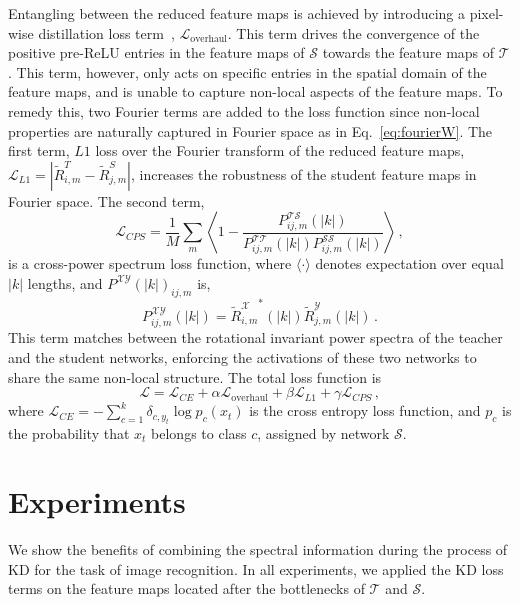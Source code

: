 \documentclass{article}
\begin{document}
Entangling between the reduced feature maps is achieved by introducing a pixel-wise distillation loss term~\cite{heo2019comprehensive}, $\mathcal{L}_{\text{overhaul}}$. This term drives the convergence of the positive pre-ReLU entries in the feature maps of $\mathcal{S}$ towards the feature maps of $\mathcal{T}$. This term, however, only acts on specific entries in the spatial domain of the feature maps, and is unable to capture non-local aspects of the feature maps. To remedy this, two Fourier terms are added to the loss function since non-local properties are naturally captured in Fourier space as in Eq.~\eqref{eq:fourierW}. The first term, $L1$ loss over the Fourier transform of the reduced feature maps, $\mathcal{L}_{L1} = \left\vert \tilde R^T_{i,m}\! -\! \tilde R^S_{j,m} \right\vert $, increases the robustness of the student feature maps in Fourier space. The second term,
\begin{equation}
    \mathcal{L}_{CPS} = \frac{1}{M}\sum_m\left\langle 1-\frac{P^{\mathcal{T}\mathcal{S}}_{ij,m}\left(\vert k \vert\right)}{P^{\mathcal{T}\mathcal{T}}_{ij,m}\left(\vert k \vert\right)P^{\mathcal{S}\mathcal{S}}_{ij,m}\left(\vert k \vert\right)} \right\rangle \,,
\end{equation}
is a cross-power spectrum loss function, where $\langle \cdot \rangle$ denotes expectation over equal $\vert k \vert$ lengths, and $P^{\mathcal{X}\mathcal{Y}}\left(\vert k \vert\right)_{ij,m}$ is,
\begin{equation}
    P^{\mathcal{X}\mathcal{Y}}_{ij,m}\left(\vert k \vert\right) =  \left.{\tilde R^{\mathcal{X}}_{i,m}}\right.^*\left(\vert k \vert \right)\tilde R^{\mathcal{Y}}_{j,m} \left(\vert k \vert \right) \,.
\end{equation}
This term matches between the rotational invariant power spectra of the teacher and the student networks, enforcing the activations of these two networks to share the same non-local structure. The total loss function is
\begin{equation}
    \mathcal{L} = \mathcal{L}_{CE} + \alpha\mathcal{L}_{\text{overhaul}} +  \beta\mathcal{L}_{L1}+ \gamma\mathcal{L}_{CPS} \,,
\end{equation}
where $\mathcal{L}_{CE} = -\sum_{c=1}^k \delta_{c,y_t}\log p_c\left(x_t\right) $ is the cross entropy loss function, and $p_c$ is the probability that $x_t$ belongs to class $c$, assigned by network $\mathcal{S}$. 



\section{Experiments}
We show the benefits of combining the spectral information during the process of KD for the task of image recognition. In all experiments, we applied the KD loss terms on the feature maps located after the bottlenecks of $\mathcal{T}$ and $\mathcal{S}$. 
\end{document}
